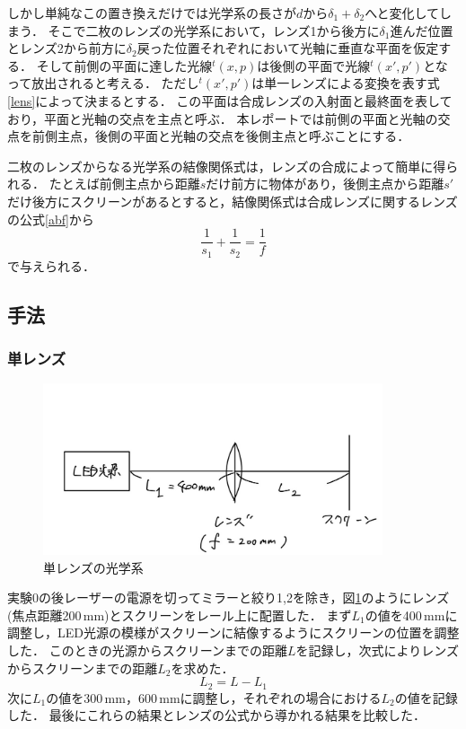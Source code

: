 \documentclass[titlepage]{jsarticle}
\begin{document}
しかし単純なこの置き換えだけでは光学系の長さが$d$から$\delta_1+\delta_2$へと変化してしまう．
そこで二枚のレンズの光学系において，レンズ1から後方に$\delta_1$進んだ位置とレンズ2から前方に$\delta_2$戻った位置それぞれにおいて光軸に垂直な平面を仮定する．
そして前側の平面に達した光線$^t(x,p)$は後側の平面で光線$^t(x',p')$となって放出されると考える．
ただし$^t(x',p')$は単一レンズによる変換を表す式\eqref{lens}によって決まるとする．
この平面は合成レンズの入射面と最終面を表しており，平面と光軸の交点を主点と呼ぶ．
本レポートでは前側の平面と光軸の交点を前側主点，後側の平面と光軸の交点を後側主点と呼ぶことにする．

二枚のレンズからなる光学系の結像関係式は，レンズの合成によって簡単に得られる．
たとえば前側主点から距離$s$だけ前方に物体があり，後側主点から距離$s'$だけ後方にスクリーンがあるとすると，結像関係式は合成レンズに関するレンズの公式\eqref{abf}から
\begin{equation}
    \frac{1}{s_1} + \frac{1}{s_2} = \frac{1}{f} \label{ssf}
\end{equation}
で与えられる．

\subsection{手法}
\subsubsection{単レンズ}
\begin{figure}
    \centering
    \includegraphics[width=10cm]{single.jpg}
    \caption{単レンズの光学系}
    \label{fig:single}
\end{figure}

実験0の後レーザーの電源を切ってミラーと絞り1,2を除き，図\ref{fig:single}のようにレンズ(焦点距離200\,mm)とスクリーンをレール上に配置した．
まず$L_1$の値を400\,mmに調整し，LED光源の模様がスクリーンに結像するようにスクリーンの位置を調整した．
このときの光源からスクリーンまでの距離$L$を記録し，次式によりレンズからスクリーンまでの距離$L_2$を求めた．
\begin{equation}
    L_2 = L - L_1
\end{equation}
次に$L_1$の値を300\,mm，600\,mmに調整し，それぞれの場合における$L_2$の値を記録した．
最後にこれらの結果とレンズの公式から導かれる結果を比較した．
\end{document}
